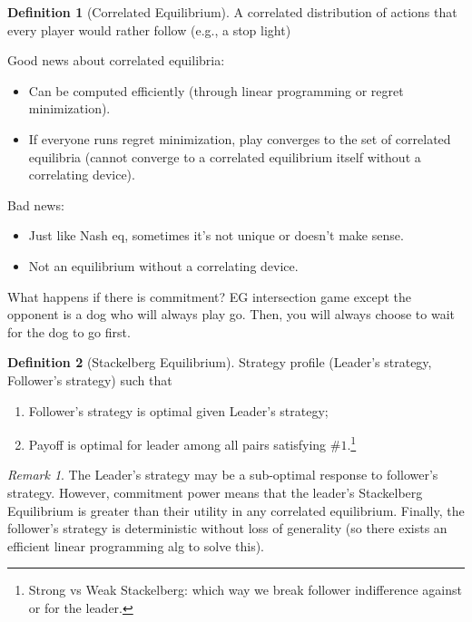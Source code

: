 \documentclass[dvipsnames]{article}
\theoremstyle{definition}
\newtheorem{definition}{Definition}[section]
\theoremstyle{remark}
\newtheorem*{remark}{Remark}
\begin{document}
\begin{definition}[Correlated Equilibrium]
	A correlated distribution of actions that every player would rather follow (e.g., a stop light)
\end{definition}

Good news about correlated equilibria: 
\begin{itemize}
	\item Can be computed efficiently (through linear programming or regret minimization).
	\item If everyone runs regret minimization, play converges to the set of correlated equilibria (cannot converge to a correlated equilibrium itself without a correlating device).
\end{itemize}

Bad news:
\begin{itemize}
	\item Just like Nash eq, sometimes it's not unique or doesn't make sense.
	\item Not an equilibrium without a correlating device. 
\end{itemize}

What happens if there is commitment? EG intersection game except the opponent is a dog who will always play go. Then, you will always choose to wait for the dog to go first.

\begin{definition}[Stackelberg Equilibrium]
	Strategy profile (Leader's strategy, Follower's strategy) such that
	\begin{enumerate}
		\item Follower's strategy is optimal given Leader's strategy;
		\item Payoff is optimal for leader among all pairs satisfying $\#1$.\footnote{Strong vs Weak Stackelberg: which way we break follower indifference against or for the leader.}
	\end{enumerate}
\end{definition}

\begin{remark}
	The Leader's strategy may be a sub-optimal response to follower's strategy. However, commitment power means that the leader's Stackelberg Equilibrium is greater than their utility in any correlated equilibrium. Finally, the follower's strategy is deterministic without loss of generality (so there exists an efficient linear programming alg to solve this). 
\end{remark}
\end{document}
